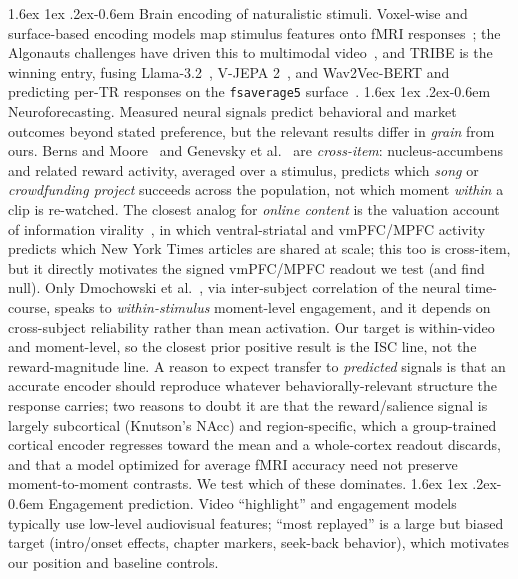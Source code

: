 \documentclass[11pt]{article}
\makeatletter
\renewcommand\paragraph{\@startsection{paragraph}{4}{\z@}%
  {1.6ex \@plus1ex \@minus.2ex}{-0.6em}%
  {\normalfont\normalsize\sffamily\bfseries}}
\makeatother
\begin{document}
\paragraph{Brain encoding of naturalistic stimuli.} Voxel-wise and surface-based encoding models
map stimulus features onto fMRI responses~\citep{naselaris2011encoding,huth2016semantic}; the
Algonauts challenges have driven this to multimodal video~\citep{gifford2025algonauts}, and TRIBE
is the winning entry, fusing Llama-3.2~\citep{grattafiori2024llama},
V-JEPA 2~\citep{assran2025vjepa2}, and Wav2Vec-BERT and predicting per-TR responses on the
\texttt{fsaverage5} surface~\citep{dascoli2025tribe}.
\paragraph{Neuroforecasting.} Measured neural signals predict behavioral and market outcomes beyond
stated preference, but the relevant results differ in \emph{grain} from ours. Berns and
Moore~\citep{berns2012neural} and Genevsky et al.~\citep{genevsky2017brain} are \emph{cross-item}:
nucleus-accumbens and related reward activity, averaged over a stimulus, predicts which \emph{song}
or \emph{crowdfunding project} succeeds across the population, not which moment \emph{within} a clip
is re-watched. The closest analog for \emph{online content} is the valuation account of information
virality~\citep{scholz2017virality}, in which ventral-striatal and vmPFC/MPFC activity predicts which
New York Times articles are shared at scale; this too is cross-item, but it directly motivates the
signed vmPFC/MPFC readout we test (and find null). Only Dmochowski et
al.~\citep{dmochowski2014audience}, via inter-subject correlation of the neural time-course, speaks
to \emph{within-stimulus} moment-level engagement, and it depends on cross-subject reliability rather
than mean activation. Our target is within-video and moment-level, so the closest prior positive
result is the ISC line, not the reward-magnitude line.
A reason to expect transfer to \emph{predicted} signals is that an accurate encoder should reproduce
whatever behaviorally-relevant structure the response carries; two reasons to doubt it are that the
reward/salience signal is largely subcortical (Knutson's NAcc) and region-specific, which a
group-trained cortical encoder regresses toward the mean and a whole-cortex readout discards, and
that a model optimized for average fMRI accuracy need not preserve moment-to-moment contrasts. We
test which of these dominates.
\paragraph{Engagement prediction.} Video ``highlight'' and engagement models typically use
low-level audiovisual features; ``most replayed'' is a large but biased target (intro/onset
effects, chapter markers, seek-back behavior), which motivates our position and baseline controls.
\end{document}
